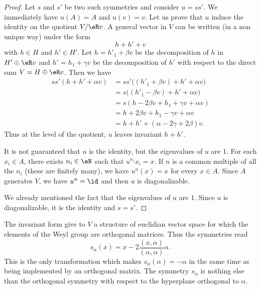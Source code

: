 \begin{proof}
	Let \( s\) and \( s'\) be two such symmetries and consider \( u=ss'\). We immediately have \( u(A)=A\) and \( u(v)=v\). Let us prove that \( u\) induce the identity on the quotient \( V/\eR v\). A general vector in \( V\) can be written (in a non unique way) under the form
	\begin{equation}
		h+h'+v
	\end{equation}
	with \( h\in H\) and \( h'\in H'\). Let \( h=h'_1+\beta v\) be the decomposition of \( h\) in \( H'\oplus \eR v\) and \( h'=h_1+\gamma v\) be the decomposition of \( h'\) with respect to the direct sum \( V=H\oplus\eR v\).  Then we have
	\begin{subequations}
		\begin{align}
			ss'(h+h'+\alpha v) & =ss'\big( (h'_1+\beta v)+h'+\alpha v \big) \\
			                   & =s\big( (h'_1-\beta v)+h'+\alpha v \big)   \\
			                   & =s(h-2\beta v+h_1+\gamma v+\alpha v)       \\
			                   & =h+2\beta v+h_1-\gamma v+\alpha v          \\
			                   & =h+h'+(\alpha-2\gamma+2\beta)v.
		\end{align}
	\end{subequations}
	Thus at the level of the quotient, $u$ leaves invariant \( h+h'\).

	It is not guaranteed that \( u\) is the identity, but the eigenvalues of \( u\) are \( 1\). For each \( x_i\in A\), there exists \( n_i\in\eN\) such that \( u^{n_i}x_i=x\). If \( n\) is a common multiple of all the \( n_i\) (these are finitely many), we have \( u^n(x)=x\) for every \( x\in A\). Since \( A\) generates \( V\), we have \( u^n=\id\) and then \( u\) is diagonalizable.

	We already mentioned the fact that the eigenvalues of \( u\) are \( 1\). Since \( u\) is diagonalizable, it is the identity and \( s=s'\).
\end{proof}

The invariant form give to \( V\) a structure of euclidian vector space for which the elements of the Weyl group are orthogonal matrices. Thus the symmetries read
\begin{equation}    \label{EqSymparnnusul}
	s_{\alpha}(x)=x-2\frac{ (x,\alpha) }{ (\alpha,\alpha) }\alpha.
\end{equation}
This is the only transformation which makes \( s_{\alpha}(\alpha)=-\alpha\) in the same time as being implemented by an orthogonal matrix. The symmetry \( s_{\alpha}\) is nothing else than the orthogonal symmetry with respect to the hyperplane orthogonal to \( \alpha\).


